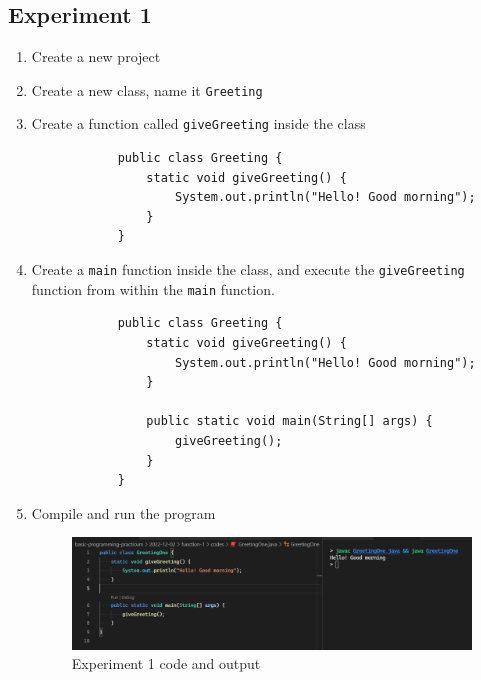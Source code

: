 \documentclass[12pt,titlepage]{article}
\begin{document}
\subsection{Experiment 1}
\begin{enumerate}
    \item Create a new project
    \item Create a new class, name it \texttt{Greeting}
    \item {
        Create a function called \texttt{giveGreeting} inside the class

        \begin{verbatim}
            public class Greeting {
                static void giveGreeting() {
                    System.out.println("Hello! Good morning");
                }
            }
        \end{verbatim}
    }
    \item {
        Create a \texttt{main} function inside the class, and execute the \texttt{giveGreeting}
        function from within the \texttt{main} function.

        \begin{verbatim}
            public class Greeting {
                static void giveGreeting() {
                    System.out.println("Hello! Good morning");
                }

                public static void main(String[] args) {
                    giveGreeting();
                }
            }
        \end{verbatim}
    }
    \pagebreak
    \item {
        Compile and run the program

        \begin{figure}[h]
            \centering
            \includegraphics[width=.8\textwidth]{./images/greeting-one.png}
            \caption{Experiment 1 code and output}
        \end{figure}
    }
\end{enumerate}
\end{document}
